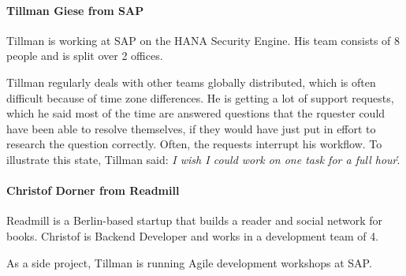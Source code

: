 \paragraph{Tillman Giese from SAP}
Tillman is working at SAP on the HANA Security Engine. His team consists of 8 people and is split over 2 offices.

Tillman regularly deals with other teams globally distributed, which is often difficult because of time zone differences. He is getting a lot of support requests, which he said most of the time are answered questions that the rquester could have been able to resolve themselves, if they would have just put in effort to research the question correctly. Often, the requests interrupt his workflow. To illustrate this state, Tillman said: \'\emph{I wish I could work on one task for a full hour}\'.

\paragraph{Christof Dorner from Readmill}
Readmill is a Berlin-based startup that builds a reader and social network for books. Christof is Backend Developer and works in a development team of 4.



As a side project, Tillman is running Agile development workshops at SAP.
